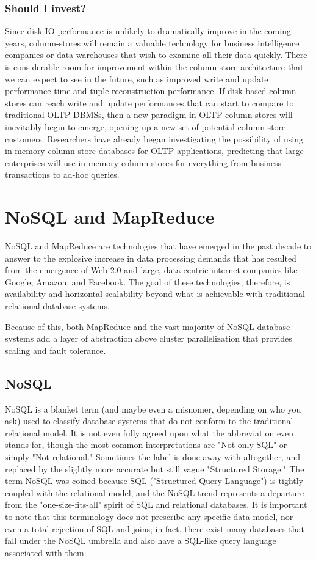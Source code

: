 \documentclass[11pt,a4paper]{report}
\begin{document}
\subsection{Should I invest?}
Since disk IO performance is unlikely to dramatically improve in the coming years, column-stores will remain a valuable technology for business intelligence companies or data warehouses that wish to examine all their data quickly. There is considerable room for improvement within the column-store architecture that we can expect to see in the future, such as improved write and update performance time and tuple reconstruction performance. If disk-based column-stores can reach write and update performances that can start to compare to traditional OLTP DBMSs, then a new paradigm in OLTP column-stores will inevitably begin to emerge, opening up a new set of potential column-store customers. Researchers have already began investigating the possibility of using in-memory column-store databases for OLTP applications, predicting that large enterprises will use in-memory column-stores for everything from business transactions to ad-hoc queries. \cite{plattner2009common}

\chapter{NoSQL and MapReduce}
NoSQL and MapReduce are technologies that have emerged in the past decade to answer to the explosive increase in data processing demands that has resulted from the emergence of Web 2.0 and large, data-centric internet companies like Google, Amazon, and Facebook.\cite{leavitt2010will} The goal of these technologies, therefore, is availability and horizontal scalability beyond what is achievable with traditional relational database systems.

Because of this, both MapReduce and the vast majority of NoSQL database systems add a layer of abstraction above cluster parallelization that provides scaling and fault tolerance.


\section{NoSQL}
NoSQL is a blanket term (and maybe even a misnomer, depending on who you ask) used to classify database systems that do not conform to the traditional relational model. It is not even fully agreed upon what the abbreviation even stands for, though the most common interpretations are "Not only SQL" or simply "Not relational."\cite{cattell2011scalable} Sometimes the label is done away with altogether, and replaced by the slightly more accurate but still vague "Structured Storage." The term NoSQL was coined because SQL ("Structured Query Language") is tightly coupled with the relational model, and the NoSQL trend represents a departure from the "one-size-fits-all" spirit of SQL and relational databases.\cite{strauch2011nosql}  It is important to note that this terminology does not prescribe any specific data model, nor even a total rejection of SQL and joins; in fact, there exist many databases that fall under the NoSQL umbrella and also have a SQL-like query language associated with them. 
\end{document}
